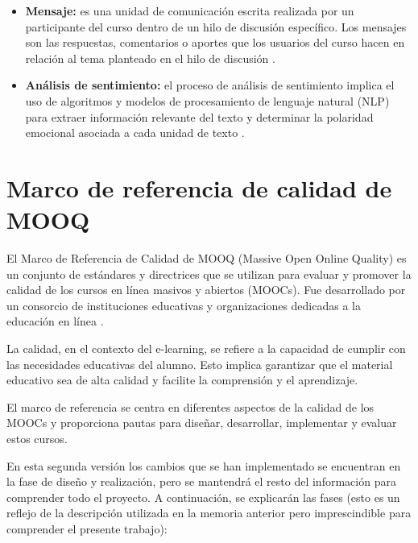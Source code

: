 \begin{itemize}
	\item \textbf{Mensaje:} es una unidad de comunicación escrita realizada por un participante del curso dentro de un hilo de discusión específico. Los mensajes son las respuestas, comentarios o aportes que los usuarios del curso hacen en relación al tema planteado en el hilo de discusión \cite{CHENG2011253}.  
	\item \textbf{Análisis de sentimiento:} el proceso de análisis de sentimiento implica el uso de algoritmos y modelos de procesamiento de lenguaje natural (NLP) para extraer información relevante del texto y determinar la polaridad emocional asociada a cada unidad de texto \cite{sentimentalanalysis}.  
\end{itemize}


\section{Marco de referencia de calidad de MOOQ}
El Marco de Referencia de Calidad de MOOQ (Massive Open Online Quality) es un conjunto de estándares y directrices que se utilizan para evaluar y promover la calidad de los cursos en línea masivos y abiertos (MOOCs). Fue desarrollado por un consorcio de instituciones educativas y organizaciones dedicadas a la educación en línea \cite{stracke2018quality}.

La calidad, en el contexto del e-learning, se refiere a la capacidad de cumplir con las necesidades educativas del alumno. Esto implica garantizar que el material educativo sea de alta calidad y facilite la comprensión y el aprendizaje.

El marco de referencia se centra en diferentes aspectos de la calidad de los MOOCs y proporciona pautas para diseñar, desarrollar, implementar y evaluar estos cursos.

En esta segunda versión los cambios que se han implementado se encuentran en la fase de diseño y realización, pero se mantendrá el resto del información para comprender todo el proyecto. A continuación, se explicarán las fases (esto es un reflejo de la descripción utilizada en la memoria anterior pero imprescindible para comprender el presente trabajo):

